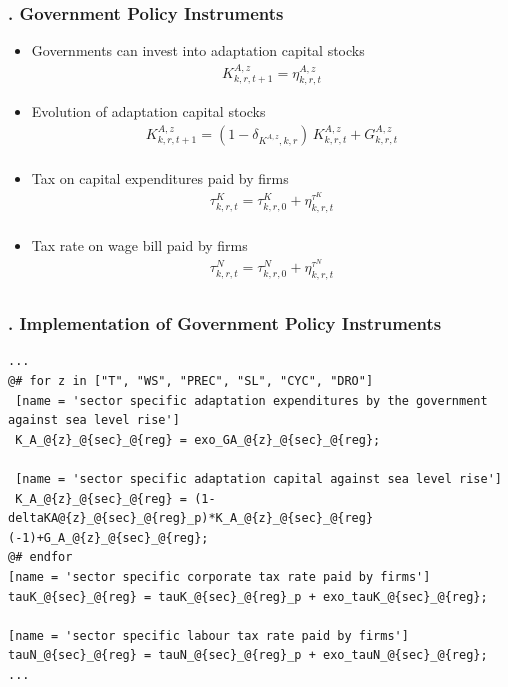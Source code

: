 \documentclass[11pt,aspectratio=169]{beamer}
\begin{document}
\begin{frame}
\frametitle{{\thesection.\thesubsection} Government Policy Instruments}
\scriptsize
\begin{itemize}
\item Governments can invest into adaptation capital stocks
\begin{align*}
K^{A,z}_{k,r,t+1} = \eta^{A,z}_{k,r,t}
\end{align*}
\item Evolution of adaptation capital stocks
\begin{align*}
K^{A,z}_{k,r,t+1} = (1 - \delta_{K^{A,z},k,r}) \, K^{A,z}_{k,r,t} + G^{A,z}_{k,r,t} \nonumber \\
\end{align*}
\item Tax on capital expenditures paid by firms
\begin{align*}
\tau^{K}_{k,r,t} = \tau^{K}_{k,r,0} + \eta^{\tau^{K}}_{k,r,t} \nonumber \\
\end{align*}
\item Tax rate on wage bill paid by firms
\begin{align*}
\tau^{N}_{k,r,t} = \tau^{N}_{k,r,0} + \eta^{\tau^{N}}_{k,r,t} \nonumber \\
\end{align*}
\end{itemize}
\end{frame}


\begin{frame}[fragile]
\frametitle{{\thesection.\thesubsection} Implementation of Government Policy Instruments}

\begin{lstlisting}[frame = single]
...
@# for z in ["T", "WS", "PREC", "SL", "CYC", "DRO"]
 [name = 'sector specific adaptation expenditures by the government against sea level rise']
 K_A_@{z}_@{sec}_@{reg} = exo_GA_@{z}_@{sec}_@{reg};

 [name = 'sector specific adaptation capital against sea level rise']
 K_A_@{z}_@{sec}_@{reg} = (1-deltaKA@{z}_@{sec}_@{reg}_p)*K_A_@{z}_@{sec}_@{reg}(-1)+G_A_@{z}_@{sec}_@{reg};
@# endfor
[name = 'sector specific corporate tax rate paid by firms']
tauK_@{sec}_@{reg} = tauK_@{sec}_@{reg}_p + exo_tauK_@{sec}_@{reg};

[name = 'sector specific labour tax rate paid by firms']
tauN_@{sec}_@{reg} = tauN_@{sec}_@{reg}_p + exo_tauN_@{sec}_@{reg};	
...
\end{lstlisting}
\end{frame}
\end{document}
